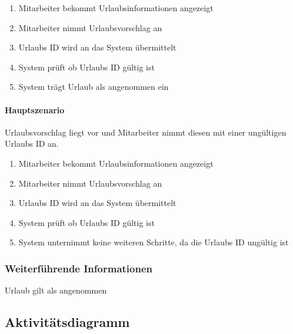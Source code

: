 \begin{enumerate}
	\item Mitarbeiter bekommt Urlaubsinformationen angezeigt
	\item Mitarbeiter nimmt Urlaubsvorschlag an
	\item Urlaubs ID wird an das System übermittelt
	\item System prüft ob Urlaubs ID gültig ist
	\item System trägt Urlaub als angenommen ein
\end{enumerate}



\paragraph{Hauptszenario}
Urlaubsvorschlag liegt vor und Mitarbeiter nimmt diesen mit einer ungültigen Urlaubs ID an.

\begin{enumerate}
	\item Mitarbeiter bekommt Urlaubsinformationen angezeigt
	\item Mitarbeiter nimmt Urlaubsvorschlag an
	\item Urlaubs ID wird an das System übermittelt
	\item System prüft ob Urlaubs ID gültig ist
	\item System unternimmt keine weiteren Schritte, da die Urlaubs ID ungültig ist
\end{enumerate}


\subsubsection{Weiterführende Informationen}
Urlaub gilt als angenommen

\subsection{Aktivitätsdiagramm}

